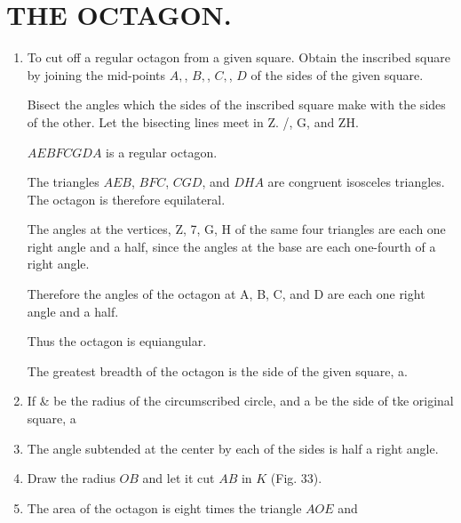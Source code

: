 
\chapter{THE OCTAGON.}


\begin{enumerate}

    \item To cut off a regular octagon from a given square.  Obtain the
        inscribed square by joining the mid-points $A,$, $B,$, $C,$, $D$ of the
        sides of the given square.


        Bisect the angles which the sides of the inscribed square make with the
        sides of the other. Let the bisecting lines meet in Z. /, G, and ZH.

        $AEBFCGDA$ is a regular octagon.
    
        The triangles $AEB$, $BFC$, $CGD$, and $DHA$ are congruent isosceles
        triangles.  The octagon is therefore equilateral.
    
        The angles at the vertices, Z, 7, G, H of the same four triangles are
        each one right angle and a half, since the angles at the base are each
        one-fourth of a right angle.
    
        Therefore the angles of the octagon at A, B, C, and D are each one right
        angle and a half.
    
        Thus the octagon is equiangular.
    
        The greatest breadth of the octagon is the side of the given square, a.
    
    \item If \& be the radius of the circumscribed circle, and a be the side of
        tke original square, a
    
    \item The angle subtended at the center by each of the sides is half a right
        angle.
    
    
    \item Draw the radius $OB$ and let it cut $AB$ in $K$ (Fig. 33).
    
%
%
%
%
%
%
%
%
%
%
%
%
%
%
%
%
%
%
%
%
%
%
    \item The area of the octagon is eight times the triangle $AOE$ and
%
%


\end{enumerate}
